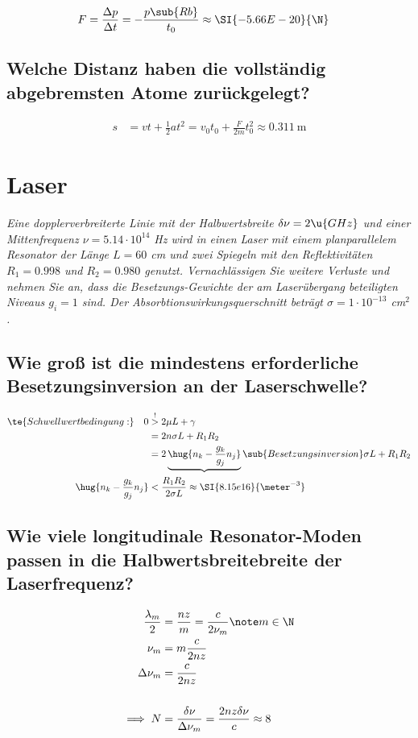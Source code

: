 \documentclass[ex]{exercise_4.1}
\begin{document}
\dottedlinete

\begin{align*}
    F &= \frac{\Delta p}{\Delta t} = -\frac{p\sub{Rb}}{t_0} \approx \SI{-5.66E-20}{\N}
\end{align*}


\subsection{Welche Distanz haben die vollständig abgebremsten Atome zurückgelegt?}

\dottedlinete

\begin{align*}
    s &= v t + \frac12 a t^2
    = v_0 t_0 + \frac{F}{2m}  t_0^2
    \approx \SI{0.311}{\m}
\end{align*}

\section{Laser}
{\it Eine dopplerverbreiterte Linie mit der Halbwertsbreite $\delta\nu = 2\u{GHz}$ und einer Mittenfrequenz $\nu = 5.14\cdot10^{14}$ Hz
wird in einen Laser mit einem planparallelem Resonator der Länge $L = 60$ cm und zwei Spiegeln mit den
Reflektivitäten $R_1 = 0.998$ und $R_2 = 0.980$ genutzt. Vernachlässigen Sie weitere Verluste und nehmen Sie an,
dass die Besetzungs-Gewichte der am Laserübergang beteiligten Niveaus $g_i = 1$ sind. Der Absorbtionswirkungsquerschnitt beträgt $\sigma = 1 \cdot 10^{-13}$ cm$^2$.}

\subsection{Wie groß ist die mindestens erforderliche Besetzungsinversion an der Laserschwelle?}

\dottedlinete

\begin{align*}
    \te{Schwellwertbedingung:}\quad 0 &\overset!> 2\mu L+\gamma \\
    &= 2n\sigma  L + R_1 R_2 \\
    &= 2\underbrace{\hug{n_k - \frac{g_k}{g_j}n_j}}\sub{Besetzungsinversion}\sigma L + R_1 R_2 \\
    \hug{n_k - \frac{g_k}{g_j}n_j} &<  \frac{R_1 R_2}{2\sigma L}\approx  \SI{8.15e16}{\meter^{-3}}
\end{align*}

\subsection{Wie viele longitudinale Resonator-Moden passen in die Halbwertsbreitebreite der Laserfrequenz?}

\dottedlinete

\begin{align*}
    \frac{\lambda_m}{2} &= \frac {nz}m=\frac{c}{2\nu_m}\note m\in\N\\
    \nu_m &= m \frac{c}{2nz}\\    
    \Delta \nu_m &= \frac{c}{2nz}\\    
    \\
    \implies N &= \frac{\delta \nu }{\Delta \nu_m }
    = \frac{2n z \delta \nu}{c} \approx 8
\end{align*}
\end{document}
